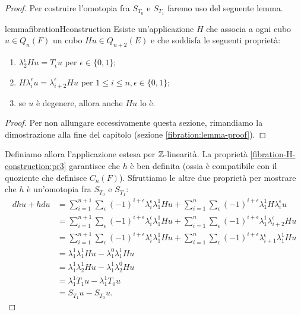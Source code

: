 \begin{proof}
Per costruire l'omotopia fra $S_{T_0}$ e $S_{T_1}$ faremo uso del seguente lemma.
\begin{restatable}{lemma}{fibrationHconstruction}
Esiste un'applicazione $H$ che associa a ogni cubo $u\in Q_n(F)$ un cubo $Hu\in Q_{n+2}(E)$ e che soddisfa le seguenti proprietà:
\begin{enumerate}
\item\label{fibration-H-construction:pr1} $\lambda^\epsilon_2Hu=T_\epsilon u$ per $\epsilon\in\{0,1\}$;
\item\label{fibration-H-construction:pr2} $H\lambda^\epsilon_iu=\lambda^\epsilon_{i+2}Hu$ per $1\le i\le n,\epsilon\in\{0,1\}$;
\item\label{fibration-H-construction:pr3} se $u$ è degenere, allora anche $Hu$ lo è.
\end{enumerate}
\end{restatable}
\begin{proof}
Per non allungare eccessivamente questa sezione, rimandiamo la dimostrazione alla fine del capitolo (sezione \ref{fibration:lemma-proof}).
\end{proof}
Definiamo allora l'applicazione
estesa per $\mathbb{Z}$-linearità. La proprietà \ref{fibration-H-construction:pr3} garantisce che $h$ è ben definita (ossia è compatibile con il quoziente che definisce $C_n(F)$). Sfruttiamo le altre due proprietà per mostrare che $h$ è un'omotopia fra $S_{T_0}$ e $S_{T_1}$:
\begin{align*}
dhu+hdu&=\sum_{i=1}^{n+1}\sum_\epsilon(-1)^{i+\epsilon}\lambda^\epsilon_i\lambda^1_1Hu+\sum_{i=1}^n\sum_\epsilon(-1)^{i+\epsilon}\lambda^1_1H\lambda^\epsilon_iu\\
&=\sum_{i=1}^{n+1}\sum_\epsilon(-1)^{i+\epsilon}\lambda^\epsilon_i\lambda^1_1Hu+\sum_{i=1}^n\sum_\epsilon(-1)^{i+\epsilon}\lambda^1_1\lambda^\epsilon_{i+2}Hu\\
&=\sum_{i=1}^{n+1}\sum_\epsilon(-1)^{i+\epsilon}\lambda^\epsilon_i\lambda^1_1Hu+\sum_{i=1}^n\sum_\epsilon(-1)^{i+\epsilon}\lambda^\epsilon_{i+1}\lambda^1_1Hu\\
&=\lambda^1_1\lambda^1_1Hu-\lambda^0_1\lambda^1_1Hu\\
&=\lambda^1_1\lambda^1_2Hu-\lambda^1_1\lambda^0_2Hu\\
&=\lambda^1_1T_1u-\lambda^1_1T_0u\\
&=S_{T_1}u-S_{T_0}u.
\end{align*}
\end{proof}
